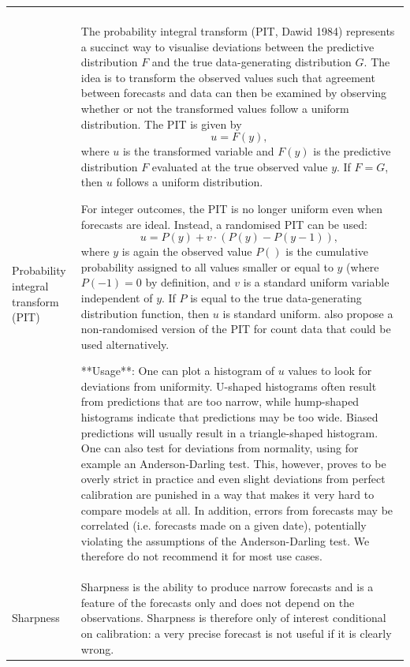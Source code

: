 \documentclass[
]{jss}
\begin{document}
\begin{CodeChunk}
\begin{longtable}[t]{>{\raggedright\arraybackslash}p{1.1in}>{\raggedright\arraybackslash}p{4.625in}}
\cellcolor{gray!6}{  **Usage**: Quantile coverage is similar to interval coverage, but conveys more information. For example, it allows us to look at the 5\% and 95\% quantile separately, instead of jointly at the 90\% prediction interval). This helps to diagnose whether it is the upper or lower end of a prediction interval that is causing problems. Plots of quantile coverage are conceptually very similar to PIT histograms.}\\
\addlinespace
Probability integral transform (PIT) & The probability integral transform (PIT, Dawid 1984) represents a succinct way to visualise deviations between the predictive distribution $F$ and the true data-generating distribution $G$. The idea is to transform the observed values such that agreement between forecasts and data can then be examined by observing whether or not the transformed values follow a uniform distribution. The PIT is given by
  $$u = F (y),$$
  where $u$ is the transformed variable and $F(y)$ is the predictive distribution $F$ evaluated at the true observed value $y$. If $F = G$, then $u$ follows a uniform distribution.

  For integer outcomes, the PIT is no longer uniform even when forecasts are ideal. Instead, a randomised PIT can be used:
  $$u = P(y) + v \cdot (P(y) - P(y - 1) ),$$
  where $y$ is again the observed value $P()$ is the cumulative probability assigned to all values smaller or equal to $y$ (where $P(-1) = 0$ by definition, and $v$ is a standard uniform variable independent of $y$. If $P$ is equal to the true data-generating distribution function, then $u$ is standard uniform.  also propose a non-randomised version of the PIT for count data that could be used alternatively.

  **Usage**:
  One can plot a histogram of $u$ values to look for deviations from uniformity. U-shaped histograms often result from predictions that are too narrow, while hump-shaped histograms indicate that predictions may be too wide. Biased predictions will usually result in a triangle-shaped histogram. One can also test for deviations from normality, using for example an Anderson-Darling test. This, however, proves to be overly strict in practice and even slight deviations from perfect calibration are punished in a way that makes it very hard to compare models at all. In addition, errors from forecasts may be correlated (i.e. forecasts made on a given date), potentially violating the assumptions of the Anderson-Darling test. We therefore do not recommend it for most use cases.\\
\addlinespace
Sharpness & Sharpness is the ability to produce narrow forecasts and is a feature of the forecasts only and does not depend on the observations. Sharpness is therefore only of interest conditional on calibration: a very precise forecast is not useful if it is clearly wrong.


\end{longtable}
\end{CodeChunk}
\end{document}
